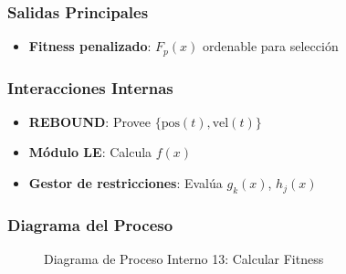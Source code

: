 \subsubsection{Salidas Principales}
\begin{itemize}
    \item \textbf{Fitness penalizado}: $F_p(x)$ ordenable para selección
\end{itemize}

\subsubsection{Interacciones Internas}
\begin{itemize}
    \item \textbf{REBOUND}: Provee $\{\text{pos}(t), \text{vel}(t)\}$
    \item \textbf{Módulo LE}: Calcula $f(x)$
    \item \textbf{Gestor de restricciones}: Evalúa $g_k(x)$, $h_j(x)$
\end{itemize}
\newpage
\subsubsection{Diagrama del Proceso}
\begin{figure}[H]
    \centering
    \caption{Diagrama de Proceso Interno 13: Calcular Fitness}%
    \label{fig:process_diagram13}
\end{figure}
\newpage